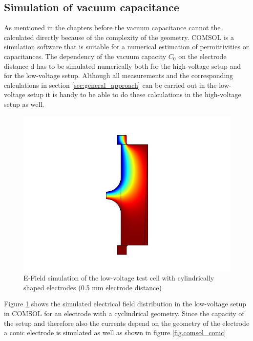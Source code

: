 \subsection{Simulation of vacuum capacitance} 
\label{sec.sim_vac_comsol}
As mentioned in the chapters before the vacuum capacitance cannot the calculated directly because of the complexity of the geometry. COMSOL is a simulation software that is suitable for a numerical estimation of permittivities or capacitances. The dependency of the vacuum capacity $C_0$ on the electrode distance d has to be simulated numerically both for the high-voltage setup and for the low-voltage setup. Although all measurements and the corresponding calculations in section \ref{sec:general_approach} can be carried out in the low-voltage setup it is handy to be able to do these calculations in the high-voltage setup as well. 


\begin{figure}[htbp]
	\centering
	\includegraphics{figures/COMSOL_Beispielbild.jpg}		
	\caption[Kurze Abbildungsbeschreibung]{E-Field simulation of the low-voltage test cell with cylindrically shaped electrodes (0.5 mm electrode distance)} \label{fig.comsol_beispiel}

\end{figure}
 
Figure \ref{fig.comsol_beispiel} shows the simulated electrical field distribution in the low-voltage setup in COMSOL for an electrode with a cyclindrical geometry. Since the capacity of the setup and therefore also the currents depend on the geometry of the electrode a conic electrode is simulated as well as shown in figure  \ref{fig.comsol_conic}

